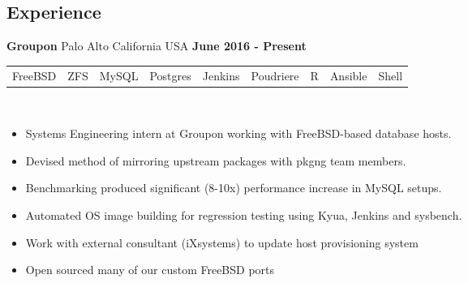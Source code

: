 \documentclass[resmargin,line,12pt]{res}
\begin{document}
{\begin{resume}
\vspace*{.20in}
{\color{Black}
  \vspace{-.13in}
  \section{\sc Experience}}
\color{black}

{\bf Groupon} Palo Alto California USA \hfill {\bf June 2016 - Present} \
\\
\begin{tabular}{l l l l l l l l l}
  FreeBSD & ZFS & MySQL & Postgres & Jenkins & Poudriere & R & Ansible & Shell
\end{tabular}
\\
\vspace{-.16in}
\begin{itemize}
  \item Systems Engineering intern at Groupon working with FreeBSD-based database hosts.
  \item Devised method of mirroring upstream packages with pkgng team members.
    \item Benchmarking produced significant (8-10x) performance increase in MySQL setups.
    \item Automated OS image building for 
      regression testing using Kyua, Jenkins and sysbench.
    \item Work with external consultant (iXsystems) to update
      host provisioning system
    \item Open sourced many of our custom FreeBSD ports
\end{itemize}
\vspace{-.10in}


\end{resume}}
\end{document}
